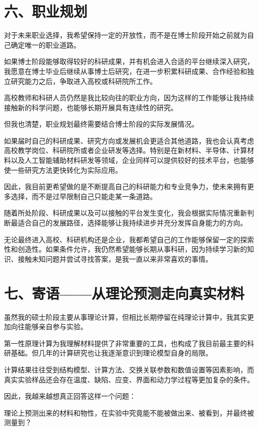 \section{六、职业规划}

对于未来职业选择，我希望保持一定的开放性，而不是在博士阶段开始之前就为自己确定唯一的职业道路。

如果博士阶段能够取得较好的科研成果，并有机会进入合适的平台继续深入研究，我愿意在博士毕业后继续从事博士后研究，在进一步积累科研成果、合作经验和独立研究能力之后，争取进入高校或科研院所工作。

高校教师和科研人员仍然是我比较向往的职业方向，因为这样的工作能够让我持续接触新的科学问题，也能够长期开展具有连续性的研究。

但我也清楚，职业规划最终需要结合博士阶段的实际发展情况。

如果届时自己的科研成果、研究方向或发展机会更适合其他道路，我也会认真考虑高校教学岗位、科研院所或者企业研发等选择。特别是在新材料、半导体、计算材料以及人工智能辅助材料研发等领域，企业同样可以提供较好的技术平台，也能够使一些研究方法更快转化为实际应用。

因此，我目前更希望做的是不断提高自己的科研能力和专业竞争力，使未来拥有更多选择，而不是过早限制自己只能走某一条道路。

随着所处阶段、科研成果以及可以接触的平台发生变化，我会根据实际情况重新判断最适合自己的发展路径，选择能够让我持续进步并充分发挥自身能力的方向。

无论最终进入高校、科研机构还是企业，我都希望自己的工作能够保留一定的探索性和创造性。如果条件允许，我仍然希望能够长期从事科研，因为持续学习新的知识、接触未知问题并尝试寻找答案，是我一直以来非常喜欢的事情。

\section{七、寄语——从理论预测走向真实材料}

虽然我的硕士阶段主要从事理论计算，但相比长期停留在纯理论计算中，我其实更加向往能够亲自参与实验。

第一性原理计算为我理解材料提供了非常重要的工具，也构成了我目前最主要的科研基础。但几年的计算研究也让我逐渐意识到理论模型自身的局限。

计算结果往往受到结构模型、计算方法、交换关联参数和数值设置等因素影响，而真实实验样品还会存在温度、缺陷、应变、界面和动力学过程等更加复杂的条件。

因此，我越来越想真正回答这样一个问题：

理论上预测出来的材料和物性，在实验中究竟能不能被做出来、被看到，并最终被测量到？


